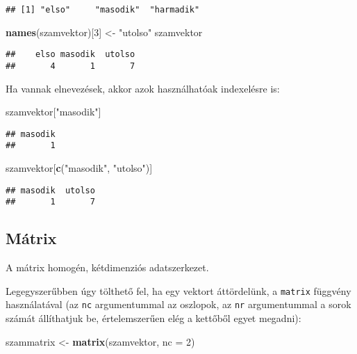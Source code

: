 \documentclass[]{book}
\newenvironment{Shaded}{\begin{snugshade}}{\end{snugshade}}
\newcommand{\KeywordTok}[1]{\textcolor[rgb]{0.13,0.29,0.53}{\textbf{#1}}}
\newcommand{\DataTypeTok}[1]{\textcolor[rgb]{0.13,0.29,0.53}{#1}}
\newcommand{\DecValTok}[1]{\textcolor[rgb]{0.00,0.00,0.81}{#1}}
\newcommand{\StringTok}[1]{\textcolor[rgb]{0.31,0.60,0.02}{#1}}
\newcommand{\NormalTok}[1]{#1}
\begin{document}
\begin{verbatim}
## [1] "elso"     "masodik"  "harmadik"
\end{verbatim}

\begin{Shaded}
\begin{Highlighting}[]
\KeywordTok{names}\NormalTok{(szamvektor)[}\DecValTok{3}\NormalTok{] <-}\StringTok{ "utolso"}
\NormalTok{szamvektor}
\end{Highlighting}
\end{Shaded}

\begin{verbatim}
##    elso masodik  utolso 
##       4       1       7
\end{verbatim}

Ha vannak elnevezések, akkor azok használhatóak indexelésre is:

\begin{Shaded}
\begin{Highlighting}[]
\NormalTok{szamvektor[}\StringTok{"masodik"}\NormalTok{]}
\end{Highlighting}
\end{Shaded}

\begin{verbatim}
## masodik 
##       1
\end{verbatim}

\begin{Shaded}
\begin{Highlighting}[]
\NormalTok{szamvektor[}\KeywordTok{c}\NormalTok{(}\StringTok{"masodik"}\NormalTok{, }\StringTok{"utolso"}\NormalTok{)]}
\end{Highlighting}
\end{Shaded}

\begin{verbatim}
## masodik  utolso 
##       1       7
\end{verbatim}

\subsection{Mátrix}\label{matrix}

A mátrix homogén, kétdimenziós adatszerkezet.

Legegyszerűbben úgy tölthető fel, ha egy vektort áttördelünk, a
\texttt{matrix} függvény használatával (az \texttt{nc} argumentummal az
oszlopok, az \texttt{nr} argumentummal a sorok számát állíthatjuk be,
értelemszerűen elég a kettőből egyet megadni):

\begin{Shaded}
\begin{Highlighting}[]
\NormalTok{szammatrix <-}\StringTok{ }\KeywordTok{matrix}\NormalTok{(szamvektor, }\DataTypeTok{nc =} \DecValTok{2}\NormalTok{)}
\end{Highlighting}
\end{Shaded}
\end{document}
